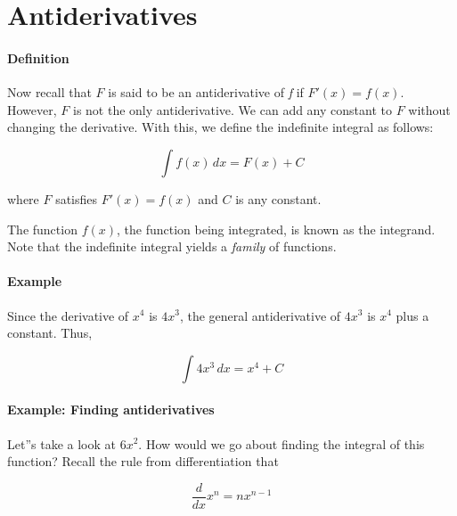 \section{Antiderivatives}
\label{sec:antiderivatives}

\paragraph{Definition}



Now recall that $F$ is said to be an antiderivative of \textit{f} if $F'(x) = f(x)$. However, $F$ is not the only antiderivative. We can add any constant to $F$ without changing the derivative. With this, we define the indefinite integral as follows:



$$\int f(x) \, dx = F(x) + C$$ 



where $F$ satisfies $F'(x) = f(x)$ and $C$ is any constant.



The function $f(x)$, the function being integrated, is known as the integrand. Note that the indefinite integral yields a \textit{family} of functions.



\paragraph{Example}



Since the derivative of $x^4$ is $4x^3$, the general antiderivative of $4x^3$ is $x^4$ plus a constant. Thus,



$$\int 4x^3 \, dx = x^4 + C$$



\paragraph{Example: Finding antiderivatives}



Let''s take a look at $6x^2$. How would we go about finding the integral of this function? Recall the rule from differentiation that



$$\frac{d}{dx} x^n = n x^{n-1}$$




